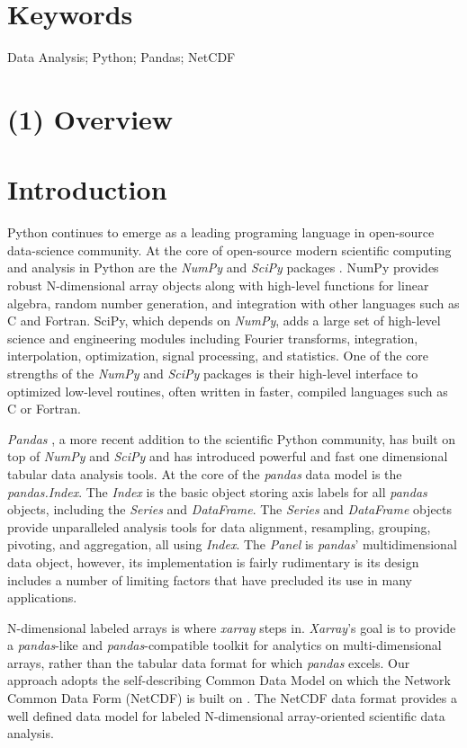 \documentclass{jors}
\begin{document}
\section*{Keywords}

{Data Analysis; Python; Pandas; NetCDF}

\section*{(1) Overview}

\section*{Introduction}

Python continues to emerge as a leading programing language in open-source data-science community.
At the core of open-source modern scientific computing and analysis in Python are the \textit{NumPy} and \textit{SciPy} packages \citep{Jones_2001,van_der_Walt_2011}.
NumPy provides robust N-dimensional array objects along with high-level functions for linear algebra, random number generation, and integration with other languages such as C and Fortran.
SciPy, which depends on \textit{NumPy}, adds a large set of high-level science and engineering modules including Fourier transforms, integration, interpolation, optimization, signal processing, and statistics.
One of the core strengths of the \textit{NumPy} and \textit{SciPy} packages is their high-level interface to optimized low-level routines, often written in faster, compiled languages such as C or Fortran.

\textit{Pandas} \citep{mckinney_2010}, a more recent addition to the scientific Python community, has built on top of \textit{NumPy} and \textit{SciPy} and has introduced powerful and fast one dimensional tabular data analysis tools.
At the core of the \textit{pandas} data model is the \textit{pandas.Index}.
The \textit{Index} is the basic object storing axis labels for all \textit{pandas} objects, including the \textit{Series} and \textit{DataFrame}.
The \textit{Series} and \textit{DataFrame} objects provide unparalleled analysis tools for data alignment, resampling, grouping, pivoting, and aggregation, all using \textit{Index}.
The \textit{Panel} is \textit{pandas}' multidimensional data object, however, its implementation is fairly rudimentary is its design includes a number of limiting factors that have precluded its use in many applications.

N-dimensional labeled arrays is where \textit{xarray} steps in.
\textit{Xarray}'s goal is to provide a \textit{pandas}-like and \textit{pandas}-compatible toolkit for analytics on multi-dimensional arrays, rather than the tabular data format for which \textit{pandas} excels.
Our approach adopts the self-describing Common Data Model on which the Network Common Data Form (NetCDF) is built on \citep{Rew_1990,Brown_1993}.
The NetCDF data format provides a well defined data model for labeled N-dimensional array-oriented scientific data analysis.
\end{document}
